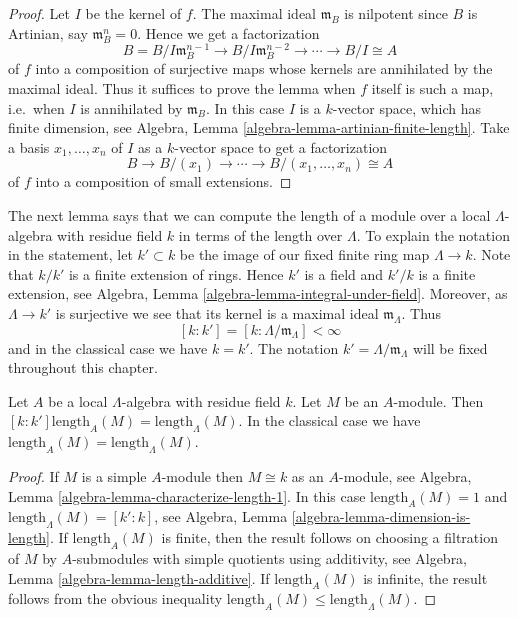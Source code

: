 \begin{proof}
Let $I$ be the kernel of $f$.  The maximal ideal $\mathfrak{m}_{B}$ is 
nilpotent since $B$ is Artinian, say $\mathfrak{m}_{B}^n = 0$. Hence we get a 
factorization
$$
B = B/I\mathfrak{m}_B^{n-1} \to B/I\mathfrak{m}_B^{n-2} \to 
\cdots \to B/I \cong A
$$
of $f$ into a composition of surjective maps whose kernels are annihilated by 
the maximal ideal.  Thus it suffices to prove the lemma when $f$ itself is such 
a map, i.e.\ when $I$ is annihilated by $\mathfrak{m}_B$. In this case
$I$ is a $k$-vector space, which has finite dimension, see
Algebra, Lemma \ref{algebra-lemma-artinian-finite-length}.
Take a basis $x_1, \dots, x_n$ of $I$ as a $k$-vector space to get a
factorization
$$
B \to B/(x_1) \to \cdots \to  B/(x_1, \dots, x_n) \cong  A
$$
of $f$ into a composition of small extensions.
\end{proof}

\noindent
The next lemma says that we can compute the length of a module over a local 
$\Lambda$-algebra with residue field $k$ in terms of the length over
$\Lambda$. To explain the notation in the statement, let $k' \subset k$
be the image of our fixed finite ring map $\Lambda \to k$. Note
that $k/k'$ is a finite extension of rings. Hence $k'$ is a field
and $k'/k$ is a finite extension, see
Algebra, Lemma \ref{algebra-lemma-integral-under-field}.
Moreover, as $\Lambda \to k'$ is surjective we see that its kernel
is a maximal ideal $\mathfrak m_\Lambda$. Thus
\begin{equation}
\label{equation-k-prime}
[k : k'] = [k : \Lambda/\mathfrak m_\Lambda] < \infty
\end{equation}
and in the classical case we have $k = k'$. The notation
$k' = \Lambda/\mathfrak m_\Lambda$ will be fixed throughout this chapter.

\begin{lemma}
\label{lemma-length}
Let $A$ be a local $\Lambda$-algebra with residue field $k$.
Let $M$ be an $A$-module. Then
$[k : k'] \text{length}_{A}(M) = \text{length}_\Lambda(M)$.
In the classical case we have
$\text{length}_{A}(M) = \text{length}_\Lambda(M)$.
\end{lemma}

\begin{proof}
If $M$ is a simple $A$-module then $M \cong k$ as an $A$-module, see
Algebra, Lemma \ref{algebra-lemma-characterize-length-1}.
In this case $\text{length}_A(M) = 1$ and
$\text{length}_\Lambda(M) = [k' : k]$, see
Algebra, Lemma \ref{algebra-lemma-dimension-is-length}.
If $\text{length}_A(M)$ is finite, then the result follows on
choosing a filtration of $M$ by $A$-submodules with simple quotients
using additivity, see
Algebra, Lemma \ref{algebra-lemma-length-additive}.
If $\text{length}_A(M)$ is infinite, the result follows from the obvious 
inequality $\text{length}_A(M) \leq \text{length}_\Lambda(M)$.
\end{proof}

